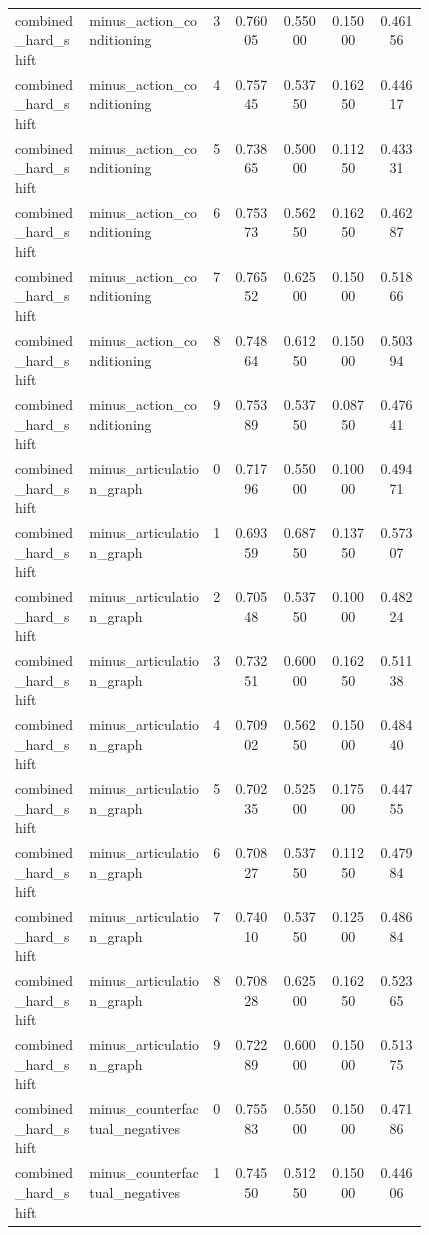 \documentclass{article}
\begin{document}
\begin{center}
\begin{longtable}{p{0.18\linewidth}p{0.30\linewidth}ccccc}
combined\_hard\_shift & minus\_action\_conditioning & 3 & 0.76005 & 0.55000 & 0.15000 & 0.46156\\
combined\_hard\_shift & minus\_action\_conditioning & 4 & 0.75745 & 0.53750 & 0.16250 & 0.44617\\
combined\_hard\_shift & minus\_action\_conditioning & 5 & 0.73865 & 0.50000 & 0.11250 & 0.43331\\
combined\_hard\_shift & minus\_action\_conditioning & 6 & 0.75373 & 0.56250 & 0.16250 & 0.46287\\
combined\_hard\_shift & minus\_action\_conditioning & 7 & 0.76552 & 0.62500 & 0.15000 & 0.51866\\
combined\_hard\_shift & minus\_action\_conditioning & 8 & 0.74864 & 0.61250 & 0.15000 & 0.50394\\
combined\_hard\_shift & minus\_action\_conditioning & 9 & 0.75389 & 0.53750 & 0.08750 & 0.47641\\
combined\_hard\_shift & minus\_articulation\_graph & 0 & 0.71796 & 0.55000 & 0.10000 & 0.49471\\
combined\_hard\_shift & minus\_articulation\_graph & 1 & 0.69359 & 0.68750 & 0.13750 & 0.57307\\
combined\_hard\_shift & minus\_articulation\_graph & 2 & 0.70548 & 0.53750 & 0.10000 & 0.48224\\
combined\_hard\_shift & minus\_articulation\_graph & 3 & 0.73251 & 0.60000 & 0.16250 & 0.51138\\
combined\_hard\_shift & minus\_articulation\_graph & 4 & 0.70902 & 0.56250 & 0.15000 & 0.48440\\
combined\_hard\_shift & minus\_articulation\_graph & 5 & 0.70235 & 0.52500 & 0.17500 & 0.44755\\
combined\_hard\_shift & minus\_articulation\_graph & 6 & 0.70827 & 0.53750 & 0.11250 & 0.47984\\
combined\_hard\_shift & minus\_articulation\_graph & 7 & 0.74010 & 0.53750 & 0.12500 & 0.48684\\
combined\_hard\_shift & minus\_articulation\_graph & 8 & 0.70828 & 0.62500 & 0.16250 & 0.52365\\
combined\_hard\_shift & minus\_articulation\_graph & 9 & 0.72289 & 0.60000 & 0.15000 & 0.51375\\
combined\_hard\_shift & minus\_counterfactual\_negatives & 0 & 0.75583 & 0.55000 & 0.15000 & 0.47186\\
combined\_hard\_shift & minus\_counterfactual\_negatives & 1 & 0.74550 & 0.51250 & 0.15000 & 0.44606\\

\end{longtable}
\end{center}
\end{document}

